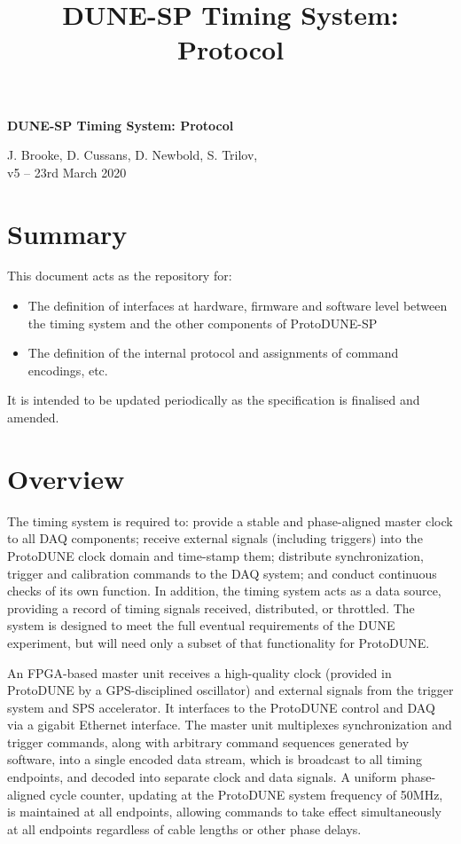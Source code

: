 \documentclass[a4paper,11pt]{article}
\begin{document}
\title{DUNE-SP Timing System: Protocol}
\begin{center}
{\LARGE\bf DUNE-SP Timing System: Protocol}
\vspace{1cm}

J. Brooke, D. Cussans, D. Newbold, S. Trilov, \\
\vspace*{1ex}
v5 -- 23rd March 2020
\end{center}
\vspace*{\fill}
\setcounter{tocdepth}{1}
\tableofcontents
\vspace*{\fill}

\section*{Summary}

This document acts as the repository for:
\begin{itemize}
\item The definition of interfaces at hardware, firmware and software level between the timing system and the other components of ProtoDUNE-SP
\item The definition of the internal protocol and assignments of command encodings, etc.
\end{itemize}
It is intended to be updated periodically as the specification is finalised and amended.

\newpage
\section{Overview}

The timing system is required to: provide a stable and phase-aligned
master clock to all DAQ components; receive external signals (including triggers)
into the ProtoDUNE clock domain and time-stamp them; distribute synchronization,
trigger and calibration commands to the DAQ system; and conduct continuous
checks of its own function. In addition, the timing system acts as a
data source, providing a record of timing signals received, distributed, or
throttled. The system is designed to meet the full eventual requirements
of the DUNE experiment, but will need only a subset of that functionality
for ProtoDUNE.

An FPGA-based master unit receives a high-quality clock (provided in
ProtoDUNE by a GPS-disciplined oscillator) and external signals from the
trigger system and SPS accelerator. It interfaces to the ProtoDUNE control
and DAQ via a gigabit Ethernet interface. The master unit multiplexes
synchronization and trigger commands, along with arbitrary command
sequences generated by software, into a single encoded data stream,
which is broadcast to all timing endpoints, and decoded into separate clock
and data signals. A uniform phase-aligned cycle counter, updating at the
ProtoDUNE system frequency of 50MHz, is maintained at all endpoints,
allowing commands to take effect simultaneously at all endpoints
regardless of cable lengths or other phase delays.
\end{document}
